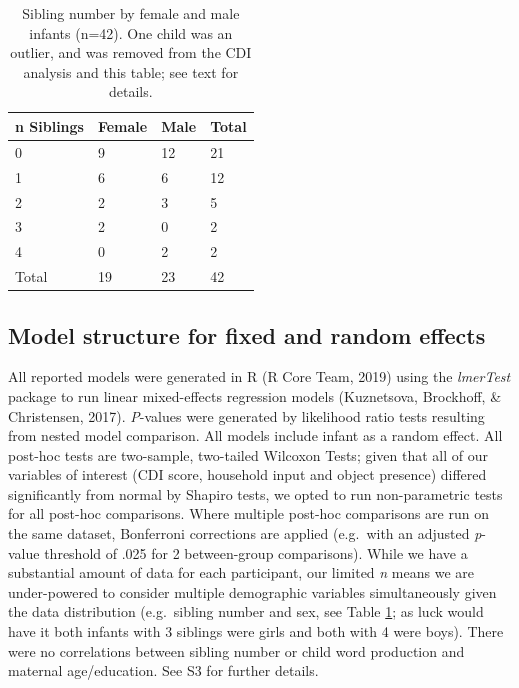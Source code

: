 \documentclass[
  english,
  man,floatsintext]{apa6}
\begin{document}
\begin{table}[tbp]

\begin{center}
\begin{threeparttable}

\caption{\label{tab:table-sibling-number}Sibling number by female and male infants (n=42). One child was an outlier, and was removed from the CDI analysis and this table; see text for details.}

\small{

\begin{tabular}{llll}
\toprule
n Siblings & \multicolumn{1}{c}{Female} & \multicolumn{1}{c}{Male} & \multicolumn{1}{c}{Total}\\
\midrule
0 & 9 & 12 & 21\\
1 & 6 & 6 & 12\\
2 & 2 & 3 & 5\\
3 & 2 & 0 & 2\\
4 & 0 & 2 & 2\\
Total & 19 & 23 & 42\\
\bottomrule
\end{tabular}

}

\end{threeparttable}
\end{center}

\end{table}

\hypertarget{model-structure-for-fixed-and-random-effects}{%
\subsection{Model structure for fixed and random effects}\label{model-structure-for-fixed-and-random-effects}}

All reported models were generated in R (R Core Team, 2019) using the \emph{lmerTest} package to run linear mixed-effects regression models (Kuznetsova, Brockhoff, \& Christensen, 2017). \emph{P}-values were generated by likelihood ratio tests resulting from nested model comparison. All models include infant as a random effect. All post-hoc tests are two-sample, two-tailed Wilcoxon Tests; given that all of our variables of interest (CDI score, household input and object presence) differed significantly from normal by Shapiro tests, we opted to run non-parametric tests for all post-hoc comparisons. Where multiple post-hoc comparisons are run on the same dataset, Bonferroni corrections are applied (e.g.~with an adjusted \emph{p}-value threshold of .025 for 2 between-group comparisons). While we have a substantial amount of data for each participant, our limited \emph{n} means we are under-powered to consider multiple demographic variables simultaneously given the data distribution (e.g.~sibling number and sex, see Table \ref{tab:table-sibling-number}; as luck would have it both infants with 3 siblings were girls and both with 4 were boys). There were no correlations between sibling number or child word production and maternal age/education. See S3 for further details.
\end{document}
